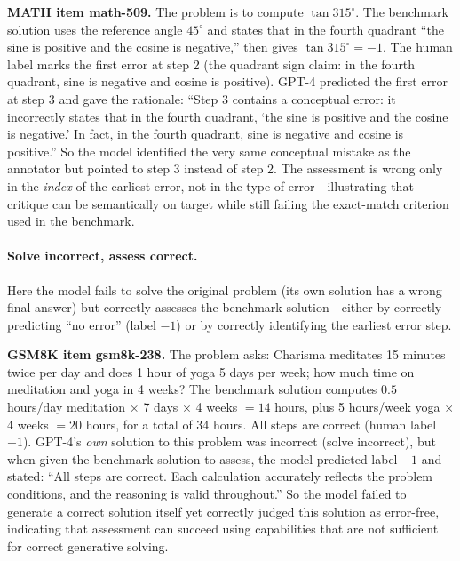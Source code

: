 \textbf{MATH item math-509.} The problem is to compute $\tan 315^\circ$. The benchmark solution uses the reference angle $45^\circ$ and states that in the fourth quadrant ``the sine is positive and the cosine is negative,'' then gives $\tan 315^\circ = -1$. The human label marks the first error at step 2 (the quadrant sign claim: in the fourth quadrant, sine is negative and cosine is positive). GPT-4 predicted the first error at step 3 and gave the rationale: ``Step 3 contains a conceptual error: it incorrectly states that in the fourth quadrant, `the sine is positive and the cosine is negative.' In fact, in the fourth quadrant, sine is negative and cosine is positive.'' So the model identified the very same conceptual mistake as the annotator but pointed to step 3 instead of step 2. The assessment is wrong only in the \emph{index} of the earliest error, not in the type of error---illustrating that critique can be semantically on target while still failing the exact-match criterion used in the benchmark.

\paragraph{Solve incorrect, assess correct.}
Here the model fails to solve the original problem (its own solution has a wrong final answer) but correctly assesses the benchmark solution---either by correctly predicting ``no error'' (label $-1$) or by correctly identifying the earliest error step.

\textbf{GSM8K item gsm8k-238.} The problem asks: Charisma meditates 15 minutes twice per day and does 1 hour of yoga 5 days per week; how much time on meditation and yoga in 4 weeks? The benchmark solution computes $0.5$ hours/day meditation $\times$ 7 days $\times$ 4 weeks $= 14$ hours, plus 5 hours/week yoga $\times$ 4 weeks $= 20$ hours, for a total of 34 hours. All steps are correct (human label $-1$). GPT-4's \emph{own} solution to this problem was incorrect (solve incorrect), but when given the benchmark solution to assess, the model predicted label $-1$ and stated: ``All steps are correct. Each calculation accurately reflects the problem conditions, and the reasoning is valid throughout.'' So the model failed to generate a correct solution itself yet correctly judged this solution as error-free, indicating that assessment can succeed using capabilities that are not sufficient for correct generative solving.

